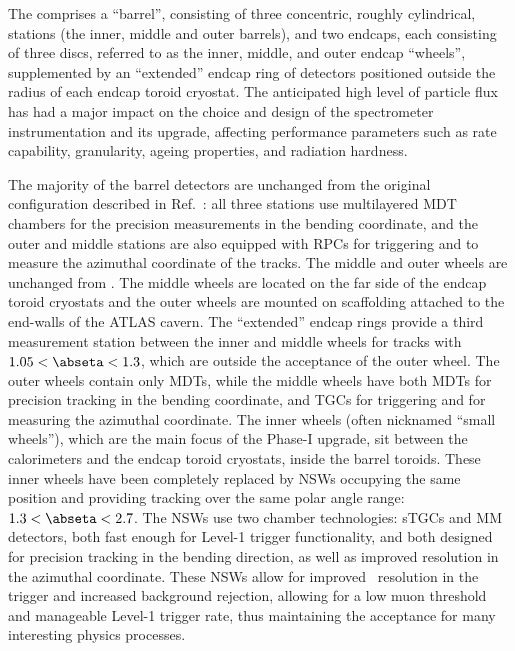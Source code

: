 \documentclass[cernpreprint, atlasdraft=false, UKenglish,british,orcidlogo, texmf, orcidlogo]{atlasdoc}
\begin{document}
The  comprises a ``barrel'', consisting of three concentric, roughly cylindrical, stations (the inner, middle and outer barrels), and two endcaps, each consisting of three discs, referred to as the inner, middle, and outer endcap ``wheels'', supplemented by an ``extended'' endcap ring of detectors positioned outside the radius of each endcap toroid cryostat.
The anticipated high level of particle flux has had a major impact on
the choice and design of the spectrometer instrumentation and its upgrade, affecting
performance parameters such as rate capability, granularity, ageing properties, and radiation hardness.
 
The majority of the barrel detectors are unchanged from the original \RunOne configuration described in Ref.~\cite{ATLAS-TDR-20}:
all three stations use multilayered \gls{MDT} chambers for the precision measurements in the bending coordinate,
and the outer and middle stations are also equipped with \glspl{RPC} for triggering and to measure the azimuthal coordinate of the tracks. The middle and outer wheels are unchanged from \RunOne. The middle wheels are located on the far side of the endcap toroid cryostats and the outer wheels are mounted on scaffolding attached to the end-walls of the ATLAS cavern. The ``extended'' endcap rings provide a third measurement station between the inner and middle wheels for tracks with $1.05 < \abseta < 1.3$, which are outside the acceptance of the outer wheel.
The outer wheels contain only \glspl{MDT}, while the middle wheels have both \glspl{MDT} for precision tracking in the bending coordinate, and \glspl{TGC} for triggering and for measuring the azimuthal coordinate. The inner wheels (often nicknamed ``small wheels''), which are the main focus of the Phase-I upgrade, sit between the calorimeters and the endcap toroid cryostats, inside the barrel toroids. These inner wheels have been completely replaced by \glspl{NSW} occupying the same position and providing tracking over the same polar angle range: $1.3 < \abseta < 2.7$. The \glspl{NSW} use two chamber technologies: \glspl{sTGC} and \gls{MM} detectors, both fast enough for Level-1 trigger functionality, and both designed for precision tracking in the bending direction, as well as improved resolution in the azimuthal coordinate. These \glspl{NSW} allow for improved \pT\ resolution in the trigger and increased background rejection, allowing for a low muon \pT threshold and manageable Level-1 trigger rate, thus maintaining the acceptance for many interesting physics processes.
 
\end{document}
